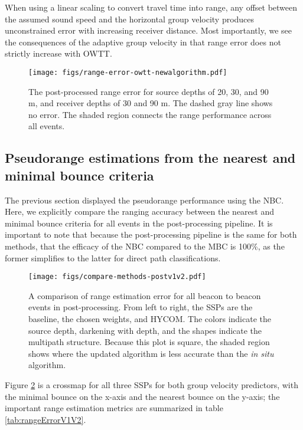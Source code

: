 When using a linear scaling to convert travel time into range, any offset between the assumed sound speed and the horizontal group velocity produces unconstrained error with increasing receiver distance.
Most importantly, we see the consequences of the adaptive group velocity in that range error does not strictly increase with OWTT.

\begin{figure}[!ht]
\texttt{[image: figs/range-error-owtt-newalgorithm.pdf]}
\caption{The post-processed range error for source depths of 20, 30, and 90 m, and receiver depths of 30 and 90 m. The dashed gray line shows no error. The shaded region connects the range performance across all events.}
\label{fig:rangeError}
\end{figure}

\FloatBarrier
\subsection{Pseudorange estimations from the nearest and minimal bounce criteria}

The previous section displayed the pseudorange performance using the NBC.
Here, we explicitly compare the ranging accuracy between the nearest and minimal bounce criteria for all events in the post-processing pipeline.
It is important to note that because the post-processing pipeline is the same for both methods, that the efficacy of the NBC compared to the MBC is 100\%, as the former simplifies to the latter for direct path classifications.

\begin{figure}[h!]
\texttt{[image: figs/compare-methods-postv1v2.pdf]}
\caption{\label{fig:compareV1V2}{A comparison of range estimation error for all beacon to beacon events in post-processing. From left to right, the SSPs are the baseline, the chosen weights, and HYCOM. The colors indicate the source depth, darkening with depth, and the shapes indicate the multipath structure. Because this plot is square, the shaded region shows where the updated algorithm is less accurate than the \textit{in situ} algorithm.}}
\end{figure}

Figure \ref{fig:compareV1V2} is a crossmap for all three SSPs for both group velocity predictors, with the minimal bounce on the x-axis and the nearest bounce on the y-axis; the important range estimation metrics are summarized in table \ref{tab:rangeErrorV1V2}.

